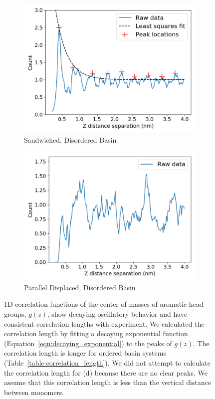\documentclass[journal=jpcbfk,manuscript=article]{achemso}
\begin{document}
\begin{figure}[!htb]
\begin{subfigure}{0.45\textwidth}
  \includegraphics[width=\textwidth]{z_correlation_sandwich_disordered.pdf}
  \caption{Sandwiched, Disordered Basin}\label{fig:z_correlation_sandwich_disordered}
  \end{subfigure}  
  \begin{subfigure}{0.45\textwidth}
  \centering
  \includegraphics[width=\textwidth]{z_correlation_offset_disordered.pdf}
  \caption{Parallel Displaced, Disordered Basin}\label{fig:z_correlation_offset_disordered}
  \end{subfigure}  
  \caption{1D correlation functions of the center of masses of aromatic head
	  groups, $g(z)$, show decaying oscillatory behavior and have consistent
	  correlation lengths with experiment. We calculated the correlation length by
	  fitting a decaying exponential function
	  (Equation~\ref{eqn:decaying_exponential}) to the peaks of $g(z)$. The
	  correlation length is longer for ordered basin systems
	  (Table~\ref{table:correlation_length}). We did not attempt to calculate the
	  correlation length for (d) because there are no clear peaks. We assume that
	  this correlation length is less than the vertical distance between
	  monomers.}\label{fig:correlation}
  \end{figure}  
  
\end{document}
